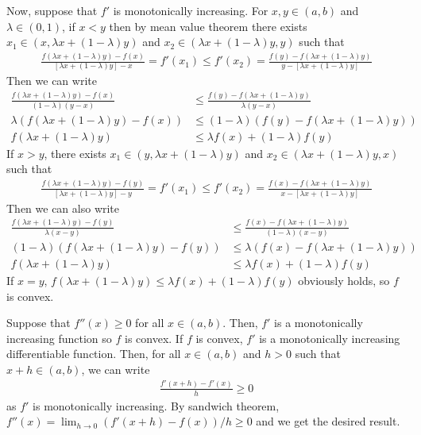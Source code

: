 \documentclass{scrartcl}
\begin{document}
Now, suppose that \(f'\) is monotonically increasing.
For \(x, y \in (a, b)\) and \(\lambda \in (0, 1)\), if \(x < y\) then by mean value theorem there exists \(x_1 \in (x, \lambda x + (1 - \lambda) y)\) and \(x_2 \in (\lambda x + (1 - \lambda) y, y)\) such that
\begin{align*}
  \frac{f(\lambda x + (1 - \lambda) y) - f(x)}{[\lambda x + (1 - \lambda) y] - x} = f'(x_1)
  \leq f'(x_2) = \frac{f(y) - f(\lambda x + (1 - \lambda) y)}{y - [\lambda x + (1 - \lambda) y]}
\end{align*}
Then we can write
\begin{align*}
  \frac{f(\lambda x + (1 - \lambda) y) - f(x)}{(1 - \lambda)(y - x)}
  &\leq \frac{f(y) - f(\lambda x + (1 - \lambda) y)}{\lambda (y - x)} \\
  \lambda (f(\lambda x + (1 - \lambda) y) - f(x)) &\leq (1 - \lambda)(f(y) - f(\lambda x + (1 - \lambda) y)) \\
  f(\lambda x + (1 - \lambda) y) &\leq \lambda f(x) + (1 - \lambda) f(y)
\end{align*}
If \(x > y\), there exists \(x_1 \in (y, \lambda x + (1 - \lambda) y)\) and \(x_2 \in (\lambda x + (1 - \lambda) y, x)\) such that
\begin{align*}
  \frac{f(\lambda x + (1 - \lambda) y) - f(y)}{[\lambda x + (1 - \lambda) y] - y} = f'(x_1)
  \leq f'(x_2) = \frac{f(x) - f(\lambda x + (1 - \lambda) y)}{x - [\lambda x + (1 - \lambda) y]}
\end{align*}
Then we can also write
\begin{align*}
  \frac{f(\lambda x + (1 - \lambda) y) - f(y)}{\lambda (x - y)}
  &\leq \frac{f(x) - f(\lambda x + (1 - \lambda) y)}{(1 - \lambda)(x - y)} \\
  (1 - \lambda)(f(\lambda x + (1 - \lambda) y) - f(y)) &\leq \lambda (f(x) - f(\lambda x + (1 - \lambda) y)) \\
  f(\lambda x + (1 - \lambda) y) &\leq \lambda f(x) + (1 - \lambda) f(y)
\end{align*}
If \(x = y\), \(f(\lambda x + (1 - \lambda) y) \leq \lambda f(x) + (1 - \lambda) f(y)\) obviously holds, so \(f\) is convex.

Suppose that \(f''(x) \geq 0\) for all \(x \in (a, b)\).
Then, \(f'\) is a monotonically increasing function so \(f\) is convex.
If \(f\) is convex, \(f'\) is a monotonically increasing differentiable function.
Then, for all \(x \in (a, b)\) and \(h > 0\) such that \(x + h \in (a, b)\), we can write
\begin{align*}
  \frac{f'(x + h) - f'(x)}{h} \geq 0
\end{align*}
as \(f'\) is monotonically increasing.
By sandwich theorem, \(f''(x) = \lim_{h \to 0} (f'(x + h) - f(x)) / h \geq 0\) and we get the desired result.
\end{document}
